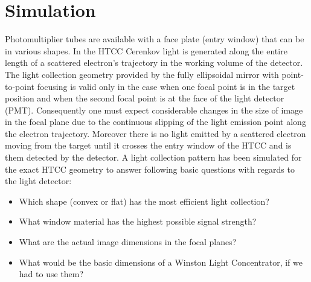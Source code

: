 \section{Simulation} Photomultiplier tubes are available with a face plate (entry window) that can be in various shapes. In the HTCC Cerenkov light is generated along the entire length of a scattered electron's trajectory in the working volume of the detector. The light collection geometry provided by the fully ellipsoidal mirror with point-to-point focusing is valid only in the case when one focal point is in the target position and when the second focal point is at the face of the light detector (PMT). Consequently one must expect considerable changes in the size of image in the focal plane due to the continuous slipping of the light emission point along the electron trajectory. Moreover there is no light emitted by a scattered electron moving from the target until it crosses the entry window of the HTCC and is them detected by the detector. A light collection pattern has been simulated for the exact HTCC geometry to answer following basic questions with regards to the light detector:

\begin{itemize}
\item Which shape (convex or flat) has the most efficient light collection?
\item What window material has the highest possible signal strength?
\item What are the actual image dimensions in the focal planes?
\item What would be the basic dimensions of a Winston Light Concentrator, if we had to use them?
\end{itemize}

